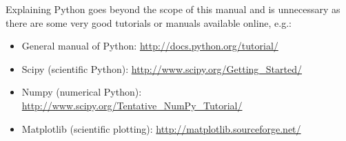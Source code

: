 \documentclass[twoside,a4paper]{report}
\begin{document}
Explaining Python goes beyond the scope of this manual and is unnecessary as there are some very good tutorials or manuals available online, e.g.:

\begin{itemize}
\item General manual of Python: \url{http://docs.python.org/tutorial/}
\item Scipy (scientific Python): \url{http://www.scipy.org/Getting_Started/}
\item Numpy (numerical Python): \url{http://www.scipy.org/Tentative_NumPy_Tutorial/}
\item Matplotlib (scientific plotting): \url{http://matplotlib.sourceforge.net/}
\end{itemize}





\setlength\bibsep{5pt}
 

\end{document}
